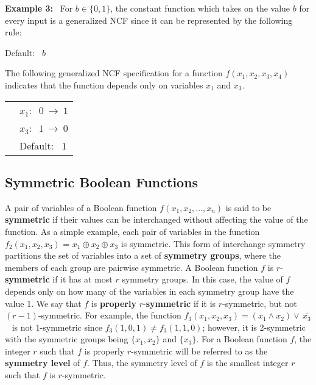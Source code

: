 \noindent
\textbf{Example 3:}~ For $b \in \{0,1\}$, the constant function which takes 
on the value $b$ for every input is a generalized NCF since 
it can be represented by the following rule: 

\smallskip

\hspace*{1.1in} Default:~ $b$ 

\smallskip

\noindent
The following generalized NCF specification for 
a function $f(x_1, x_2, x_3, x_4)$ indicates that the function
depends only on variables $x_1$ and $x_3$.

\medskip

\noindent
\begin{tabular}{ll}
\hspace*{1.1in} & $x_1:~$  $0 ~\longrightarrow~ 1$ \\ [1ex]
\hspace*{1.1in} & $x_3:~$  $1 ~\longrightarrow~ 0$ \\ [1ex]
\hspace*{1.1in} & Default:~ $1$ \\
\end{tabular}

\noindent


\fi

\subsection{Symmetric Boolean Functions}
\label{sse:symmetry}

A pair of variables of a Boolean function $f(x_1, x_2, \ldots, x_n)$ is
said to be \textbf{symmetric} if their values can be interchanged without
affecting the value of the function.
As a simple example, each pair of variables in the function 
$f_2(x_1, x_2, x_3)$ = $x_1 \oplus x_2 \oplus x_3$ is symmetric.
This form of interchange symmetry partitions the set of variables into a set of
\textbf{symmetry groups}, where the members of each group are pairwise symmetric.
A Boolean function $f$ is 
$r$-\textbf{symmetric} if it has at most $r$ symmetry groups.
In this case, the value of $f$
depends only on how many of the variables in each symmetry group have the value 1.
We say that $f$ is \textbf{properly} $r$-\textbf{symmetric} if
it is $r$-symmetric, but not $(r-1)$-symmetric.
For example, the function $f_3(x_1, x_2, x_3) = (x_1 \wedge x_2) \vee\, \overline{x_3}$~
is not 1-symmetric since $f_3(1, 0, 1) \neq f_3(1, 1, 0)$; however, 
it is 2-symmetric with the symmetric groups being $\{x_1, x_2\}$ and $\{x_3\}$.
For a Boolean function $f$, the integer $r$ such that $f$ is properly $r$-symmetric
will be referred to as the \textbf{symmetry level} of $f$.
Thus, the symmetry level of $f$ is the smallest integer $r$ such that
$f$ is $r$-symmetric.

